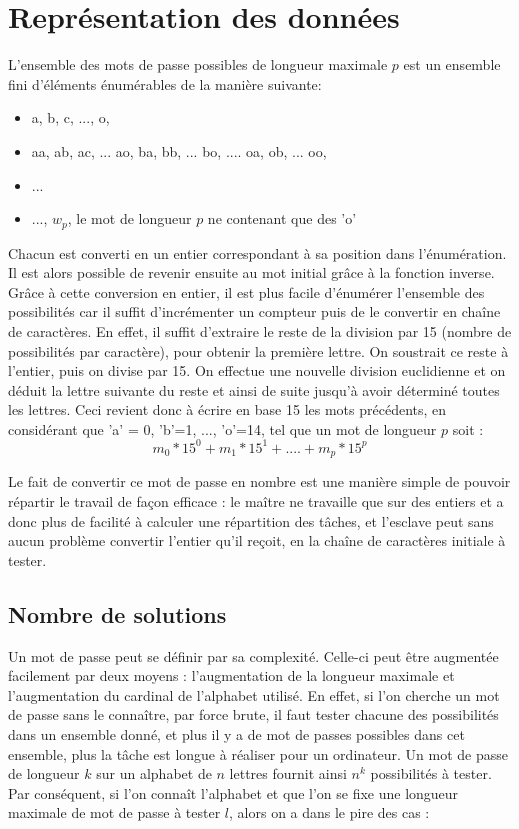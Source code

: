 \documentclass[a4paper,11pt]{article}
\begin{document}
\section{Représentation des données}
L'ensemble des mots de passe possibles de longueur maximale $p$ est un ensemble fini d'éléments énumérables de la manière suivante:
\begin{itemize}
\item a, b, c, ..., o,
\item aa, ab, ac, ... ao, ba, bb, ... bo, .... oa, ob, ... oo,
\item ...
\item ..., $w_{p}$, le mot de longueur $p$ ne contenant que des 'o'
\end{itemize}

Chacun est converti en un entier correspondant à sa position dans l'énumération. Il est alors possible de revenir ensuite au mot initial grâce à la fonction inverse. Grâce à cette conversion en entier, il est plus facile d'énumérer l'ensemble des possibilités car il suffit d'incrémenter un compteur puis de le convertir en chaîne de caractères. En effet, il suffit d'extraire le reste de la division par 15 (nombre de possibilités par caractère), pour obtenir la première lettre. On soustrait ce reste à l'entier, puis on divise par 15. On effectue une nouvelle division euclidienne et on déduit la lettre suivante du reste et ainsi de suite jusqu'à avoir déterminé toutes les lettres.
Ceci revient donc à écrire en base 15 les mots précédents, en considérant que 'a' = 0, 'b'=1, ..., 'o'=14, tel que un mot de longueur $p$ soit : 
\[
m_{0} * 15^{0} +  m_{1} * 15^{1} + .... + m_{p} * 15^{p}
\]

Le fait de convertir ce mot de passe en nombre est une manière simple de pouvoir répartir le travail de façon efficace : le maître ne travaille que sur des entiers et a donc plus de facilité à calculer une répartition des tâches, et l'esclave peut sans aucun problème convertir l'entier qu'il reçoit, en la chaîne de caractères initiale à tester.

\subsection{Nombre de solutions}

Un mot de passe peut se définir par sa complexité. Celle-ci peut être augmentée facilement par deux moyens : l'augmentation de la longueur maximale et l'augmentation du cardinal de l'alphabet utilisé. En effet, si l'on cherche un mot de passe sans le connaître, par force brute, il faut tester chacune des possibilités dans un ensemble donné, et plus il y a de mot de passes possibles dans cet ensemble, plus la tâche est longue à réaliser pour un ordinateur. Un mot de passe de longueur $k$ sur un alphabet de $n$ lettres fournit ainsi $n^k$ possibilités à tester. Par conséquent, si l'on connaît l'alphabet et que l'on se fixe une longueur maximale de mot de passe à tester $l$, alors on a dans le pire des cas :
\end{document}
